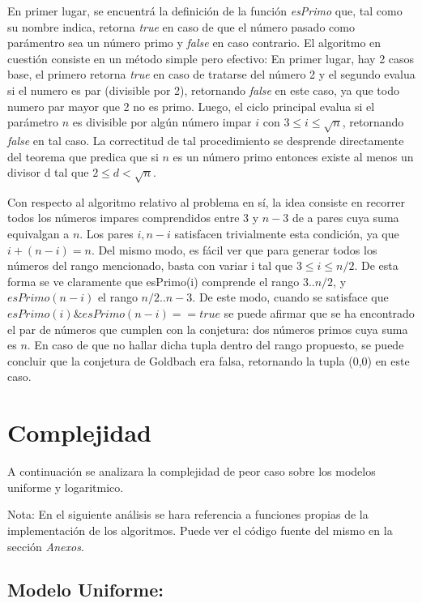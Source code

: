 \documentclass[a4paper,10pt] {article}
\begin{document}
En primer lugar, se encuentr\'a la definici\'on de la funci\'on \textit{esPrimo}
que, tal como su nombre indica, retorna \textit{true} en caso de que el n\'umero
pasado como par\'amentro sea un n\'umero primo y \textit{false} en caso
contrario. El algoritmo en cuesti\'on consiste en un m\'etodo simple pero
efectivo: En primer lugar, hay 2 casos base, el primero retorna \textit{true} en caso de
tratarse del n\'umero 2 y el segundo evalua si el numero es par (divisible por
2), retornando \textit{false} en este caso, ya que todo numero par mayor que 2
no es primo. Luego, el ciclo principal evalua si el par\'ametro $n$ es divisible
por alg\'un n\'umero impar $i$ con $3 \leq i \leq \sqrt{n}$, retornando
\textit{false} en tal caso. La correctitud de tal procedimiento se desprende
directamente del teorema que predica que si $n$ es un n\'umero primo entonces
existe al menos un divisor d tal que $2 \leq d < \sqrt{n}$.

Con respecto al algoritmo relativo al problema en s\'i, la idea consiste en
recorrer todos los n\'umeros impares comprendidos entre $3$ y $n-3$ de a pares
cuya suma equivalgan a $n$. Los pares $i, n - i$ satisfacen trivialmente esta condici\'on, ya que $i + (n-i) = n$. Del mismo modo, es f\'acil ver que para generar todos los n\'umeros del rango mencionado, basta con variar i tal que $3 \le i \le n/2$. De esta forma se ve claramente que esPrimo(i) comprende el rango $3..n/2$, y $esPrimo(n-i)$ el rango $n/2..n-3$. De este modo, cuando se satisface que $esPrimo(i) \& esPrimo(n-i) == true$ se puede afirmar que se ha encontrado el par de n\'umeros que cumplen con la conjetura: dos n\'umeros primos cuya suma es $n$. En caso de que no hallar dicha tupla dentro del rango propuesto, se puede concluir que la conjetura de Goldbach era falsa, retornando la tupla (0,0) en este caso.  

\section*{Complejidad}

A continuaci\'on se analizara la complejidad de peor caso sobre los modelos
uniforme y logaritmico.

Nota: En el siguiente an\'alisis se hara referencia a funciones propias de la implementaci\'on de los algoritmos. Puede ver el c\'odigo fuente del mismo en la secci\'on \textit{Anexos}.

\subsection*{Modelo Uniforme:}
\end{document}

